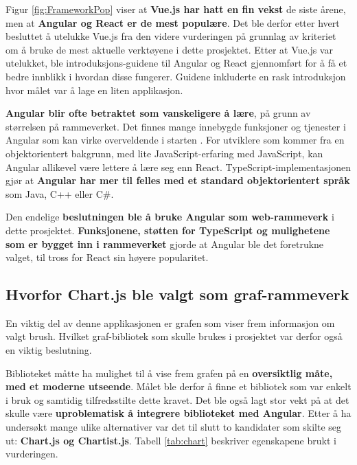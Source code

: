 \noindent Figur \ref{fig:FrameworkPop} viser at \textbf{Vue.js har hatt en fin vekst} de siste årene, men at \textbf{Angular og React er de mest populære}. Det ble derfor etter hvert besluttet å utelukke Vue.js fra den videre vurderingen på grunnlag av kriteriet om å bruke de mest aktuelle verktøyene i dette prosjektet. Etter at Vue.js var utelukket, ble introduksjons-guidene til Angular og React gjennomført for å få et bedre innblikk i hvordan disse fungerer. Guidene inkluderte en rask introduksjon hvor målet var å lage en liten applikasjon.

\textbf{Angular blir ofte betraktet som vanskeligere å lære}, på grunn av størrelsen på rammeverket. Det finnes mange innebygde funksjoner og tjenester i Angular som kan virke overveldende i starten \cite{angularvsreact}. For utviklere som kommer fra en objektorientert bakgrunn, med lite JavaScript-erfaring med JavaScript, kan Angular allikevel være lettere å lære seg enn React. TypeScript-implementasjonen gjør at \textbf{Angular har mer til felles med et standard objektorientert språk} som Java, C++ eller C\#.

Den endelige \textbf{beslutningen ble å bruke Angular som web-rammeverk} i dette prosjektet. \textbf{Funksjonene, støtten for TypeScript og mulighetene som er bygget inn i rammeverket} gjorde at Angular ble det foretrukne valget, til tross for React sin høyere popularitet.

\subsection{Hvorfor Chart.js ble valgt som graf-rammeverk}
En viktig del av denne applikasjonen er grafen som viser frem informasjon om valgt brush. Hvilket graf-bibliotek som skulle brukes i prosjektet var derfor også en viktig beslutning. 

Biblioteket måtte ha mulighet til å vise frem grafen på en \textbf{oversiktlig måte, med et moderne utseende}. Målet ble derfor å finne et bibliotek som var enkelt i bruk og samtidig tilfredsstilte dette kravet. Det ble også lagt stor vekt på at det skulle være \textbf{uproblematisk å integrere biblioteket med Angular}. Etter å ha undersøkt mange ulike alternativer var det til slutt to kandidater som skilte seg ut: \textbf{Chart.js og Chartist.js}. Tabell \ref{tab:chart} beskriver egenskapene brukt i vurderingen.


